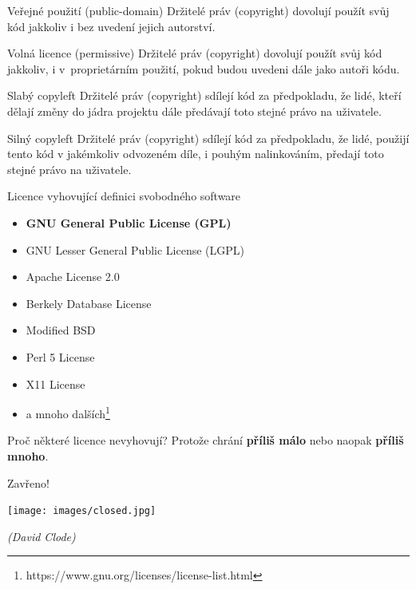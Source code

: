 \documentclass[11pt]{beamer}
\begin{document}
	\begin{frame}{Veřejné použití (public-domain)}
		Držitelé práv (copyright) dovolují použít svůj kód jakkoliv i bez uvedení jejich autorství.
	\end{frame}	
	
	\begin{frame}{Volná licence (permissive)}
		Držitelé práv (copyright) dovolují použít svůj kód jakkoliv, i v~proprietárním použití, pokud budou uvedeni dále jako autoři kódu.
	\end{frame}	
	
	\begin{frame}{Slabý copyleft}
	   Držitelé práv (copyright) sdílejí kód za předpokladu, že lidé, kteří dělají změny do jádra projektu dále předávají toto stejné právo na uživatele.
	\end{frame}	

	\begin{frame}{Silný copyleft}
	Držitelé práv (copyright) sdílejí kód za předpokladu, že lidé, použijí tento kód v jakémkoliv odvozeném díle, i pouhým nalinkováním, předají toto stejné právo na uživatele.
	\end{frame}	

	
\begin{frame}{Licence vyhovující definici svobodného software}
	\begin{itemize}
		\item \textbf{GNU General Public License (GPL)}
		\item GNU Lesser General Public License (LGPL)
		\item Apache License 2.0
		\item Berkely Database License
		\item Modified BSD
		\item Perl 5 License
		\item X11 License
		\item a mnoho dalších\footnote{https://www.gnu.org/licenses/license-list.html}
	\end{itemize}
\end{frame}

\begin{frame}{Proč některé licence nevyhovují?}
	Protože chrání \textbf{příliš málo} nebo naopak \textbf{příliš mnoho}.
\end{frame}

	\begin{frame}{Zavřeno!}
	\begin{center}
		\texttt{[image: images/closed.jpg]}
	\end{center}
	\begin{flushright}
		\textit{(David Clode)}
	\end{flushright}
\end{frame}
\end{document}
